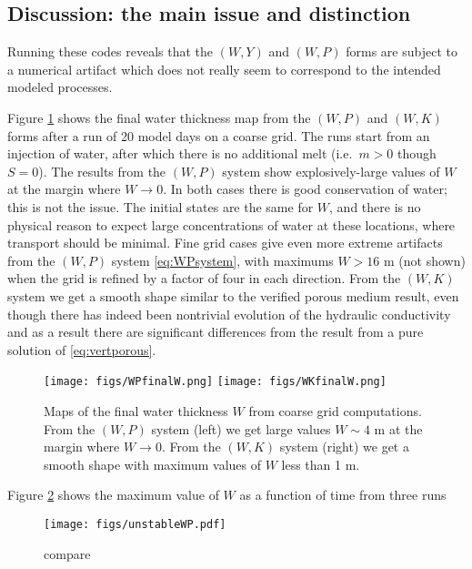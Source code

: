 \documentclass[11pt]{amsart}
\begin{document}
\subsection*{Discussion: the main issue and distinction}  Running these codes reveals that the $(W,Y)$ and $(W,P)$ forms are subject to a numerical artifact which does not really seem to correspond to the intended modeled processes.

Figure \ref{fig:finalWs} shows the final water thickness map from the $(W,P)$ and $(W,K)$ forms after a run of 20 model days on a coarse grid.  The runs start from an injection of water, after which there is no additional melt (i.e.~$m>0$ though $S=0$).  The results from the $(W,P)$ system show explosively-large values of $W$ at the margin where $W\to 0$.  In both cases there is good conservation of water; this is not the issue.  The initial states are the same for $W$, and there is no physical reason to expect large concentrations of water at these locations, where transport should be minimal.  Fine grid cases give even more extreme artifacts from the $(W,P)$ system \eqref{eq:WPsystem}, with maximums $W > 16$ m (not shown) when the grid is refined by a factor of four in each direction.  From the $(W,K)$ system we get a smooth shape similar to the verified porous medium result, even though there has indeed been nontrivial evolution of the hydraulic conductivity and as a result there are significant differences from the result from a pure solution of \eqref{eq:vertporous}.

\begin{figure}[ht]
\centering
\texttt{[image: figs/WPfinalW.png]} \quad \texttt{[image: figs/WKfinalW.png]}
\caption{Maps of the final water thickness $W$ from coarse grid computations.  From the $(W,P)$ system (left) we get large values $W\sim 4$ m at the margin where $W\to 0$.  From the $(W,K)$ system (right) we get a smooth shape with maximum values of $W$ less than 1 m.}
\label{fig:finalWs}
\end{figure}

Figure \ref{fig:maxWs} shows the maximum value of $W$ as a function of time from three runs  
\begin{figure}[ht]
\centering
\texttt{[image: figs/unstableWP.pdf]}
\caption{compare}
\label{fig:maxWs}
\end{figure}
\end{document}
